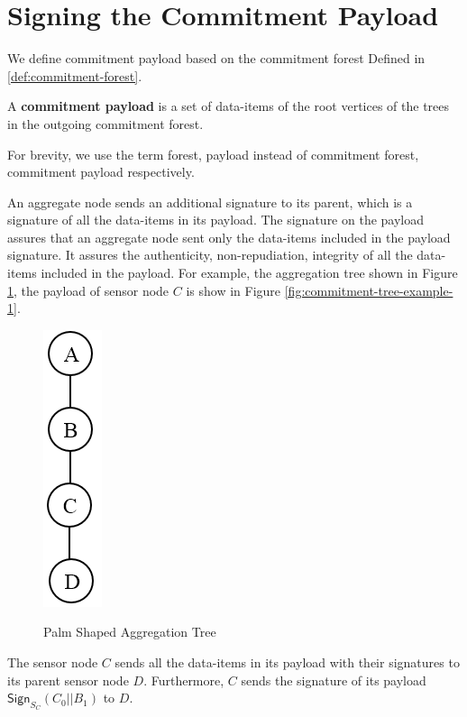 \section{Signing the Commitment Payload}
		We define commitment payload based on the commitment forest Defined in \ref{def:commitment-forest}.
	\begin{definition}
		A \textbf{commitment payload} is a set of data-items of the root vertices of the trees in the outgoing commitment forest.
	\end{definition}
	For brevity, we use the term forest, payload instead of commitment forest, commitment payload respectively.

	An aggregate node sends an additional signature to its parent, which is a signature of all the data-items in its payload.
	The signature on the payload assures that an aggregate node sent only the data-items included in the payload signature.
	It assures the authenticity, non-repudiation, integrity of all the data-items included in the payload.
	For example, the aggregation tree shown in Figure \ref{fig:Palm aggregation tree}, the payload of sensor node $C$ is show in Figure \ref{fig:commitment-tree-example-1}.
			\begin{figure}[h!]
				\centering
				\includegraphics[scale = 1]{images/palm-aggregation-tree.png}\\
				\caption{Palm Shaped Aggregation Tree}
				\label{fig:Palm aggregation tree}
			\end{figure}
		The sensor node $C$ sends all the data-items in its payload with their signatures to its parent sensor node $D$.
		Furthermore, $C$ sends the signature of its payload $\textsf{Sign}_{S_{C}}(C_{0}||B_{1})$ to $D$.\\
